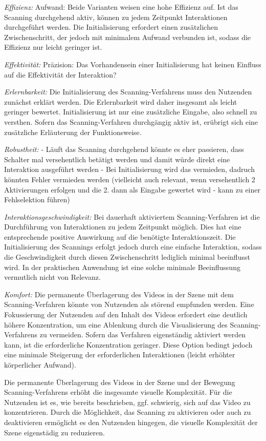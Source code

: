 \textit{Effizienz:}
Aufwand:
Beide Varianten weisen eine hohe Effizienz auf. 
Ist das Scanning durchgehend aktiv, können zu jedem Zeitpunkt Interaktionen durchgeführt werden. Die Initialisierung erfordert einen zusätzlichen Zwischenschritt, der jedoch mit minimalem Aufwand verbunden ist, sodass die Effizienz nur leicht geringer ist.

\textit{Effektivität:}
Präzision: 
Das Vorhandensein einer Initialisierung hat keinen Einfluss auf die Effektivität der Interaktion?

\textit{Erlernbarkeit:}
Die Initialisierung des Scanning-Verfahrens muss den Nutzenden zunächst erklärt werden. Die Erlernbarkeit wird daher insgesamt als leicht geringer bewertet. Initialisierung ist nur eine zusätzliche Eingabe, also schnell zu versthen. Sofern das Scanning-Verfahren durchgängig aktiv ist, erübrigt sich eine zusätzliche Erläuterung der Funktionsweise.

\textit{Robustheit:}
- Läuft das Scanning durchgehend könnte es eher passieren, dass Schalter mal versehentlich betätigt werden und damit würde direkt eine Interaktion ausgeführt werden 
- Bei Initialisierung wird das vermieden, dadruch könnten Fehler vermieden werden (vielleicht auch relevant, wenn versehentlich 2 Aktivierungen erfolgen und die 2. dann als Eingabe gewertet wird - kann zu einer Fehlselektion führen)

\textit{Interaktionsgeschwindigkeit:}
Bei dauerhaft aktiviertem Scanning-Verfahren ist die Durchführung von Interaktionen zu jedem Zeitpunkt möglich. Dies hat eine entsprechende positive Auswirkung auf die benötigte Interaktionszeit. Die Initialisierung des Scannings erfolgt jedoch durch eine einfache Interaktion, sodass die Geschwindigkeit durch diesen Zwischenschritt lediglich minimal beeinflusst wird. In der praktischen Anwendung ist eine solche minimale Beeinflussung vermutlich nicht von Relevanz.

\textit{Komfort:}
Die permanente Überlagerung des Videos in der Szene mit dem Scanning-Verfahren könnte von Nutzenden als störend empfunden werden. Eine Fokussierung der Nutzenden auf den Inhalt des Videos erfordert eine deutlich höhere Konzentration, um eine Ablenkung durch die Visualisierung des Scanning-Verfahrens zu vermeiden. Sofern das Verfahren eigenständig aktiviert werden kann, ist die erforderliche Konzentration geringer. Diese Option bedingt jedoch eine minimale Steigerung der erforderlichen Interaktionen (leicht erhöhter körperlicher Aufwand). 

Die permanente Überlagerung des Videos in der Szene und der Bewegung Scanning-Verfahrens erhöht die insgesamte visuelle Komplexität. Für die Nutzenden ist es, wie bereits beschrieben, ggf. schwierig, sich auf das Video zu konzentrieren. Durch die Möglichkeit, das Scanning zu aktivieren oder auch zu deaktivieren ermöglicht es den Nutzenden hingegen, die visuelle Komplexität der Szene eigenstädig zu reduzieren. 


